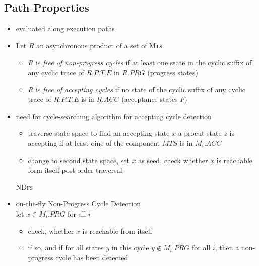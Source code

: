 \documentclass[a4paper, 10pt]{article}
\begin{document}
\subsection*{Path Properties}
\begin{itemize}
    \item evaluated along execution paths
    \item Let $R$ an asynchronous product of a set of \textsc{Mts}
    \begin{shaded}
        \begin{itemize}
            \item $R$ is \emph{free of non-progress cycles} if at least one state in the cyclic suffix of any cyclic trace of $R.P.T.E$ in $R.PRG$ {\tiny (progress states)}
            \item $R$ is \emph{free of accepting cycles} if no state of the cyclic suffix of any cyclic trace of $R.P.T.E$ is in $R.ACC$ {\tiny (acceptance states $F$)}
        \end{itemize}
    \end{shaded}
    \item need for cycle-searching algorithm for accepting cycle detection
    \begin{itemize}
        \item traverse state space to find an accepting state $x$ \follows a procut state $z$ is accepting if at least oine of the component $MTS$  is in $M_i.ACC$
        \item change to second state space, set $x$ as seed, check whether $x$ is reachable form itself \follows post-order traversal
    \end{itemize}
    \follows \textsc{NDfs}
    \item on-the-fly Non-Progress Cycle Detection
    \\ let $x\in M_i.PRG$ for all $i$
    \begin{itemize}
        \item check, whether $x$ is reachable from itself
        \item if so, and if for all states $y$ in this cycle $y\not\in M_i.PRG$ for all $i$, then a non-progress cycle has been detected
    \end{itemize}
\end{itemize}
\end{document}
